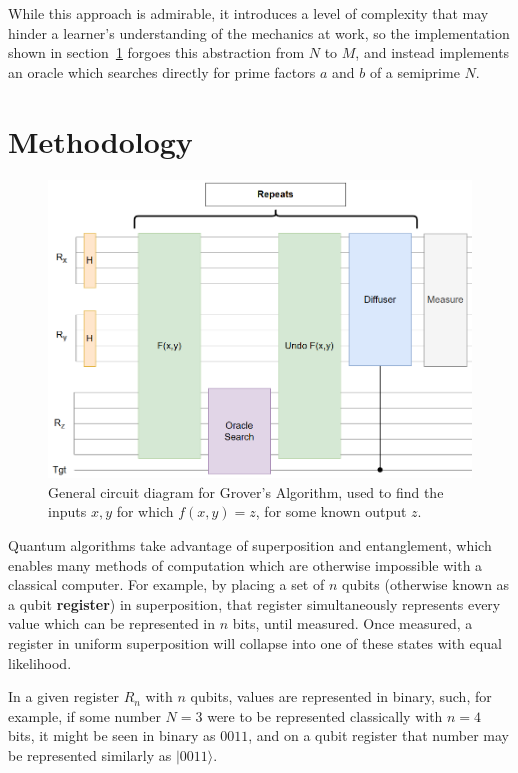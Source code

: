 \documentclass[twocolumn]{cinc}
\begin{document}
  While this approach is admirable, it introduces a level of complexity 
  that may hinder a learner's understanding of the mechanics at work,
  so the implementation shown in section\ \ref{sec:Methodology} forgoes
  this abstraction from $N$ to $M$, and instead implements an oracle which
  searches directly for prime factors $a$ and $b$ of a semiprime $N$.

\section{Methodology}\label{sec:Methodology}

\begin{figure}[!ht]\label{fig:FIGURA1}
\centering
\includegraphics[width=15.8cm]{grover_inversion.png}
\caption{General circuit diagram for Grover's Algorithm, used to find 
the inputs $x, y$ for which $f(x,y)=z$, for some known output $z$.}
\end{figure}

Quantum algorithms take advantage of superposition and entanglement,
which enables many methods of computation which are otherwise impossible
with a classical computer. For example, by placing a set of $n$ qubits 
(otherwise known as a qubit \textbf{register}) in superposition, that register
simultaneously represents every value which can be represented in $n$ bits,
until measured. Once measured, a register in uniform superposition will 
collapse into one of these states with equal likelihood.

In a given register $R_n$ with $n$ qubits, values are represented in binary,
such, for example, if some number $N=3$ were to be represented classically
with $n=4$ bits, it might be seen in binary as $0011$, and on a qubit
register that number may be represented similarly as $| 0011 \rangle$.
\end{document}
